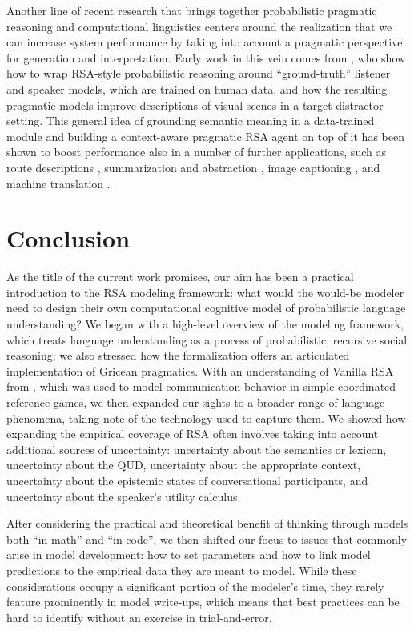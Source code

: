 \documentclass{sp}
\begin{document}
Another line of recent research that brings together probabilistic pragmatic reasoning and computational linguistics centers around the realization that we can increase system performance by taking into account a pragmatic perspective for generation and interpretation.
Early work in this vein comes from \citet{AndreasKlein2016:Reasoning-about}, who show how to wrap RSA-style probabilistic reasoning around ``ground-truth'' listener and speaker models, which are trained on human data, and how the resulting pragmatic models improve descriptions of visual scenes in a target-distractor setting.
This general idea of grounding semantic meaning in a data-trained module and building a context-aware pragmatic RSA agent on top of it has been shown to boost performance also in a number of further applications, such as route descriptions \citep{FriedHu2018:Speaker-Followe}, summarization and abstraction \citep{ShenFried2019:Pragmatically-I}, image captioning \citep{Cohn-GordonGoodman2018:Pragmatically-I,NieCohn-Gordon2020:Pragmatic-Issue}, and machine translation \citep{Cohn-GordonGoodman2019:Lost-in-Machine}.


\section{Conclusion} \label{summary}

As the title of the current work promises, our aim has been a practical introduction to the RSA modeling framework: what would the would-be modeler need to design their own computational cognitive model of probabilistic language understanding? We began with a high-level overview of the modeling framework, which treats language understanding as a process of probabilistic, recursive social reasoning; we also stressed how the formalization offers an articulated implementation of Gricean pragmatics. With an understanding of Vanilla RSA from \cite{frankgoodman2012}, which was used to model communication behavior in simple coordinated reference games, we then expanded our sights to a broader range of language phenomena, taking note of the technology used to capture them. We showed how expanding the empirical coverage of RSA often involves taking into account additional sources of uncertainty: uncertainty about the semantics or lexicon, uncertainty about the QUD, uncertainty about the appropriate context, uncertainty about the epistemic states of conversational participants, and uncertainty about the speaker's utility calculus.

After considering the practical and theoretical benefit of thinking through models both ``in math'' and ``in code'', 
we then shifted our focus to issues that commonly arise in model development: how to set parameters and how to link model predictions to the empirical data they are meant to model. While these considerations occupy a significant portion of the modeler's time, they rarely feature prominently in model write-ups, which means that best practices can be hard to identify without an exercise in trial-and-error.
\end{document}
